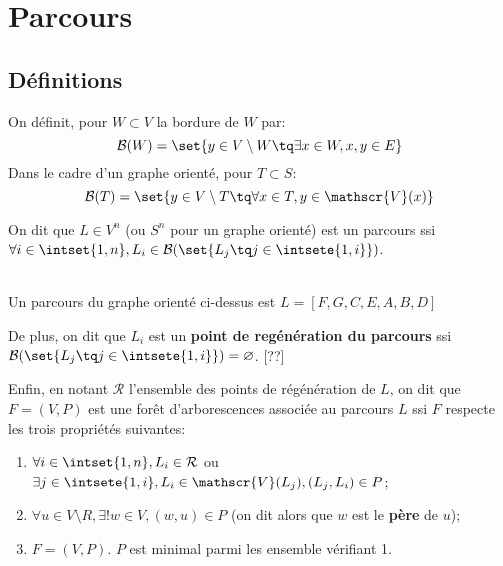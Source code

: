 \documentclass{scrartcl}
\begin{document}
	\section{Parcours}
		\subsection{Définitions}
			On définit, pour $W \subset V$ la bordure de $W$ par:
				\[ 
					\mathcal{B}(W) = 
					\set{ y \in V\setminus W \tq \exists x \in W, {x,y} \in E}
				\]
			Dans le cadre d'un graphe orienté, pour $T \subset S$:
				\[ 
					\mathcal{B}(T) = 
					\set{ y \in V\setminus T \tq \forall x \in T, y \in \mathscr{V}(x) }
				\]

			On dit que $L\in V^n$ (ou $S^n$ pour un graphe orienté) est un parcours ssi $\forall i \in \intset{1,n}, L_i \in \mathcal{B}(\set{L_j \tq j \in \intsete{1,i}})$.
			
			\begin{center}	
			 \\
			Un parcours du graphe orienté ci-dessus est $L = [F,G,C,E,A,B,D]$
			\end{center}
			

			De plus, on dit que $L_i$ est un \textbf{point de regénération du parcours} 
			ssi $\mathcal{B}(\set{L_j \tq j \in \intsete{1,i}}) = \varnothing$. [??]

			Enfin, en notant $\mathcal{R}$ l'ensemble des points de régénération de $L$,
			on dit que $F = (V,P)$ est une forêt d'arborescences associée au parcours $L$ ssi $F$ respecte les trois propriétés suivantes:
			\begin{enumerate}
				\item $\forall i \in \intset{1,n}, L_i \in \mathcal{R}$ ou $\exists j \in \intsete{1,i}, L_i \in \mathscr{V}(L_j), (L_j,L_i) \in P$;
				\item $\forall u \in V \setminus R, \exists! w \in V, (w,u) \in P$ (on dit alors que $w$ est le \textbf{père} de $u$);
				\item $F = (V,P)$. $P$ est minimal parmi les ensemble vérifiant 1.
			\end{enumerate}
\end{document}
